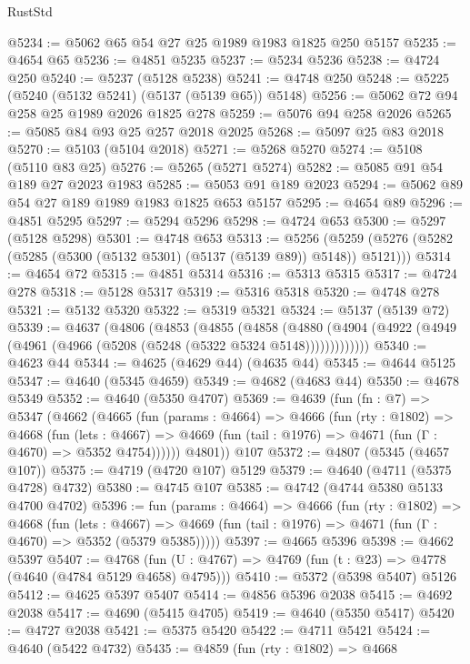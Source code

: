 \begin{lexlean}{RustStd}
\begin{coremodule}
@5234 := @5062 @65 @54 @27 @25 @1989 @1983 @1825 @250 @5157
@5235 := @4654 @65
@5236 := @4851 @5235
@5237 := @5234 @5236
@5238 := @4724 @250
@5240 := @5237 (@5128 @5238)
@5241 := @4748 @250
@5248 := @5225 (@5240 (@5132 @5241) (@5137 (@5139 @65)) @5148)
@5256 := @5062 @72 @94 @258 @25 @1989 @2026 @1825 @278
@5259 := @5076 @94 @258 @2026
@5265 := @5085 @84 @93 @25 @257 @2018 @2025
@5268 := @5097 @25 @83 @2018
@5270 := @5103 (@5104 @2018)
@5271 := @5268 @5270
@5274 := @5108 (@5110 @83 @25)
@5276 := @5265 (@5271 @5274)
@5282 := @5085 @91 @54 @189 @27 @2023 @1983
@5285 := @5053 @91 @189 @2023
@5294 := @5062 @89 @54 @27 @189 @1989 @1983 @1825 @653 @5157
@5295 := @4654 @89
@5296 := @4851 @5295
@5297 := @5294 @5296
@5298 := @4724 @653
@5300 := @5297 (@5128 @5298)
@5301 := @4748 @653
@5313 := @5256 (@5259 (@5276 (@5282 (@5285 (@5300 (@5132 @5301) (@5137 (@5139 @89)) @5148)) @5121)))
@5314 := @4654 @72
@5315 := @4851 @5314
@5316 := @5313 @5315
@5317 := @4724 @278
@5318 := @5128 @5317
@5319 := @5316 @5318
@5320 := @4748 @278
@5321 := @5132 @5320
@5322 := @5319 @5321
@5324 := @5137 (@5139 @72)
@5339 := @4637
    (@4806
      (@4853
        (@4855
          (@4858
            (@4880 (@4904 (@4922 (@4949 (@4961 (@4966 (@5208 (@5248 (@5322 @5324 @5148)))))))))))))
@5340 := @4623 @44
@5344 := @4625 (@4629 @44) (@4635 @44)
@5345 := @4644 @5125
@5347 := @4640 (@5345 @4659)
@5349 := @4682 (@4683 @44)
@5350 := @4678 @5349
@5352 := @4640 (@5350 @4707)
@5369 := @4639
    (fun (fn : @7) =>
    @5347
      (@4662
        (@4665
          (fun (params : @4664) =>
          @4666
            (fun (rty : @1802) =>
            @4668
              (fun (lets : @4667) =>
              @4669 (fun (tail : @1976) => @4671 (fun (Γ : @4670) => @5352 @4754))))))
        @4801))
    @107
@5372 := @4807 (@5345 (@4657 @107))
@5375 := @4719 (@4720 @107) @5129
@5379 := @4640 (@4711 (@5375 @4728) @4732)
@5380 := @4745 @107
@5385 := @4742 (@4744 @5380 @5133 @4700 @4702)
@5396 := fun (params : @4664) =>
  @4666
    (fun (rty : @1802) =>
    @4668
      (fun (lets : @4667) =>
      @4669 (fun (tail : @1976) => @4671 (fun (Γ : @4670) => @5352 (@5379 @5385)))))
@5397 := @4665 @5396
@5398 := @4662 @5397
@5407 := @4768 (fun (U : @4767) => @4769 (fun (t : @23) => @4778 (@4640 (@4784 @5129 @4658) @4795)))
@5410 := @5372 (@5398 @5407) @5126
@5412 := @4625 @5397 @5407
@5414 := @4856 @5396 @2038
@5415 := @4692 @2038
@5417 := @4690 (@5415 @4705)
@5419 := @4640 (@5350 @5417)
@5420 := @4727 @2038
@5421 := @5375 @5420
@5422 := @4711 @5421
@5424 := @4640 (@5422 @4732)
@5435 := @4859
    (fun (rty : @1802) =>
    @4668

\end{coremodule}
\end{lexlean}

